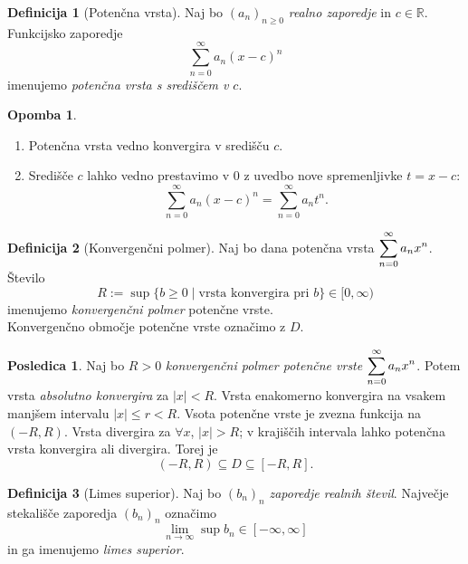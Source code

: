 \documentclass[11pt]{article}
\theoremstyle{definition}
\newtheorem{definicija}{Definicija}[section]
\theoremstyle{definition}
\theoremstyle{definition}
\theoremstyle{theorem}
\newtheorem*{posledica}{Posledica}
\newtheorem*{opomba}{Opomba}
\begin{document}
\begin{definicija}[Potenčna vrsta]

Naj bo $(a_n)_{n \geq 0}$ \textit{realno zaporedje} in $c \in \mathbb{R}$. Funkcijsko zaporedje $$\sum_{n=0}^{\infty} a_n (x - c)^n$$
imenujemo \textit{potenčna vrsta s središčem v $c$}.

\end{definicija}
\vspace{0.5cm}

\begin{opomba}
~
\begin{enumerate}
	\item Potenčna vrsta vedno konvergira v središču $c$.
	\item Središče $c$ lahko vedno prestavimo v $0$ z uvedbo nove spremenljivke $t = x - c$:
	$$\sum_{n=0}^{\infty} a_n (x-c)^n = \sum_{n=0}^{\infty} a_n t^n.$$
\end{enumerate}
\end{opomba}
\vspace{0.5cm}

\begin{definicija}[Konvergenčni polmer]

Naj bo dana potenčna vrsta $\mathlarger{\sum_{n=0}^{\infty} a_n x^n}$. Število
$$R := \sup \{b \geq 0 \mid \text{vrsta konvergira pri } b \} \in [0, \infty)$$
imenujemo \textit{konvergenčni polmer} potenčne vrste. \\
Konvergenčno območje potenčne vrste označimo z $D$.

\end{definicija}
\vspace{0.5cm}

\begin{posledica}

Naj bo $R > 0$ \textit{konvergenčni polmer potenčne vrste} $\mathlarger{\sum_{n=0}^{\infty} a_n x^n}$. Potem vrsta \textit{absolutno konvergira} za $|x| < R$. Vrsta enakomerno konvergira na vsakem manjšem intervalu $|x| \leq r < R$. Vsota potenčne vrste je zvezna funkcija na $(-R, R)$. Vrsta divergira za $\forall x$, $|x| > R$; v krajiščih intervala lahko potenčna vrsta konvergira ali divergira. Torej je
$$(-R, R) \subseteq D \subseteq [-R, R].$$

\end{posledica}
\vspace{0.5cm}

\begin{definicija}[Limes superior]

Naj bo $(b_n)_n$ \textit{zaporedje realnih števil}. Največje stekališče zaporedja $(b_n)_n$ označimo 
$$\lim_{n \rightarrow \infty} \sup b_n \in [-\infty, \infty]$$
in ga imenujemo \textit{limes superior}.

\end{definicija}
\vspace{0.5cm}
\end{document}
